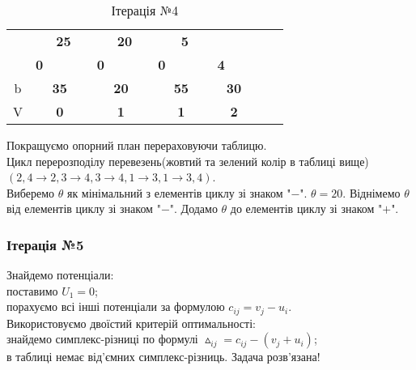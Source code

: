 \documentclass[a4paper, 12pt]{article}
\begin{document}
\begin{table}[H]
\begin{tabular}{|c|cccc|cccc|cccc|cccc|rr|}
\cline{2-2}\cline{5-5}\cline{9-10}\cline{13-13}\cline{17-17}          &       & \multicolumn{2}{c}{\multirow{2}[2]{*}{\textbf{25}}} &       &       & \multicolumn{2}{c}{\multirow{2}[2]{*}{\textbf{20}}} &       &       & \multicolumn{2}{c}{\multirow{2}[2]{*}{\textbf{5}}} &       &       & \multicolumn{2}{c}{\multirow{2}[2]{*}{}} &       & \multicolumn{1}{c|}{} &  \bigstrut[t]\\
          &       & \multicolumn{2}{c}{} &       &       & \multicolumn{2}{c}{} &       &       & \multicolumn{2}{c}{} &       &       & \multicolumn{2}{c}{} &       & \multicolumn{1}{c|}{} &  \bigstrut[b]\\
\cline{2-2}\cline{6-6}\cline{10-10}\cline{14-14}          & \multicolumn{1}{c|}{\textbf{0}} &       &       &       & \multicolumn{1}{c|}{\textbf{0}} & \multicolumn{2}{c}{} &       & \multicolumn{1}{c|}{\textbf{0}} &       &       &       & \multicolumn{1}{c|}{\textbf{4}} & \multicolumn{2}{c}{} &       & \multicolumn{1}{c|}{} &  \bigstrut\\
    \hline
    b     & \multicolumn{4}{c|}{\textbf{35}} & \multicolumn{4}{c|}{\textbf{20}} & \multicolumn{4}{c|}{\textbf{55}} & \multicolumn{4}{c|}{\textbf{30}} &       &  \bigstrut\\
\cline{1-17}    V     & \multicolumn{4}{c|}{\textbf{0}} & \multicolumn{4}{c|}{\textbf{1}} & \multicolumn{4}{c|}{\textbf{1}} & \multicolumn{4}{c|}{\textbf{2}} &       &  \bigstrut\\
    \hline
    \end{tabular}%
  \caption{Ітерація №4}
  \label{tab:it4}%
\end{table}%

Покращуємо опорний план перераховуючи таблицю.\\

Цикл перерозподілу перевезень(жовтий та зелений колір в таблиці вище) $(2,4 \longrightarrow 2,3 \longrightarrow 4,3 \longrightarrow 4,1 \longrightarrow 3,1 \longrightarrow 3,4)$.\\

Виберемо $\theta$ як мінімальний з елементів циклу зі знаком "$-$". $\theta = 20$. Віднімемо $\theta$ від елементів циклу зі знаком "$-$". Додамо $\theta$ до елементів циклу зі знаком "$+$".

\subsubsection{Ітерація №5}

Знайдемо потенціали:\\
поставимо $U_1 = 0$;\\
порахуємо всі інші потенціали за формулою $c_{ij} = v_j - u_i$.\\
Використовуємо двоїстий критерій оптимальності:\\
знайдемо симплекс-різниці по формулі $\vartriangle_{ij} = c_{ij} - (v_j + u_i) $;\\
в таблиці немає від'ємних симплекс-різниць. Задача розв'язана!
\end{document}
